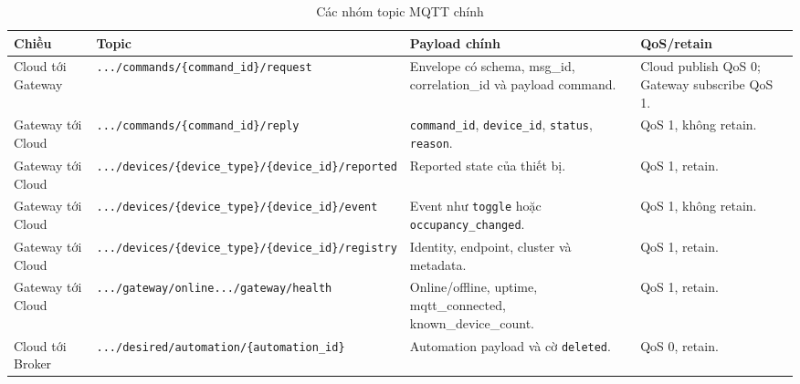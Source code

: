 \begin{table}[H]
    \centering
    \caption{Các nhóm topic MQTT chính}
    \label{tab:ch3-mqtt-topics}
    \footnotesize
    \setlength{\tabcolsep}{3pt}
    \begin{tabular}{|>{\raggedright\arraybackslash}p{2.4cm}|>{\raggedright\arraybackslash}p{4.8cm}|>{\raggedright\arraybackslash}p{4.0cm}|>{\raggedright\arraybackslash}p{2.1cm}|}
        \hline
        \textbf{Chiều} & \textbf{Topic} & \textbf{Payload chính} & \textbf{QoS/retain} \\
        \hline
        Cloud tới Gateway & \texttt{.../commands/}\newline\texttt{\{command\_id\}/request} & Envelope có schema, msg\_id, correlation\_id và payload command. & Cloud publish QoS 0; Gateway subscribe QoS 1. \\
        \hline
        Gateway tới Cloud & \texttt{.../commands/}\newline\texttt{\{command\_id\}/reply} & \texttt{command\_id}, \texttt{device\_id}, \texttt{status}, \texttt{reason}. & QoS 1, không retain. \\
        \hline
        Gateway tới Cloud & \texttt{.../devices/}\newline\texttt{\{device\_type\}/}\newline\texttt{\{device\_id\}/reported} & Reported state của thiết bị. & QoS 1, retain. \\
        \hline
        Gateway tới Cloud & \texttt{.../devices/}\newline\texttt{\{device\_type\}/}\newline\texttt{\{device\_id\}/event} & Event như \texttt{toggle} hoặc \texttt{occupancy\_changed}. & QoS 1, không retain. \\
        \hline
        Gateway tới Cloud & \texttt{.../devices/}\newline\texttt{\{device\_type\}/}\newline\texttt{\{device\_id\}/registry} & Identity, endpoint, cluster và metadata. & QoS 1, retain. \\
        \hline
        Gateway tới Cloud & \texttt{.../gateway/online}\newline\texttt{.../gateway/health} & Online/offline, uptime, mqtt\_connected, known\_device\_count. & QoS 1, retain. \\
        \hline
        Cloud tới Broker & \texttt{.../desired/}\newline\texttt{automation/\{automation\_id\}} & Automation payload và cờ \texttt{deleted}. & QoS 0, retain. \\
        \hline
    \end{tabular}
    \setlength{\tabcolsep}{6pt}
\end{table}

